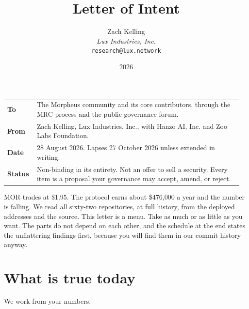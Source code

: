 \documentclass[11pt,a4paper]{article}
\title{Letter of Intent}
\author{Zach Kelling\\\textit{Lux Industries, Inc.}\\\texttt{research@lux.network}}
\date{2026}
\begin{document}
\luxcoverpage

\noindent
\begin{tabular}{@{}p{0.12\linewidth}p{0.84\linewidth}@{}}
\textbf{To} & The Morpheus community and its core contributors, through the MRC
process and the public governance forum.\\[0.4ex]
\textbf{From} & Zach Kelling, Lux Industries, Inc., with Hanzo AI, Inc. and Zoo
Labs Foundation.\\[0.4ex]
\textbf{Date} & 28 August 2026. Lapses 27 October 2026 unless extended in writing.\\[0.4ex]
\textbf{Status} & Non-binding in its entirety. Not an offer to sell a security.
Every item is a proposal your governance may accept, amend, or reject.
\end{tabular}

\vspace{1.0ex}

\noindent MOR trades at \$1.95. The protocol earns about \$476{,}000 a year and
the number is falling. We read all sixty-two repositories, at full history, from
the deployed addresses and the source. This letter is a menu. Take as much or as
little as you want. The parts do not depend on each other, and the schedule at
the end states the unflattering findings first, because you will find them in our
commit history anyway.

\section*{What is true today}

We work from your numbers.
\end{document}

